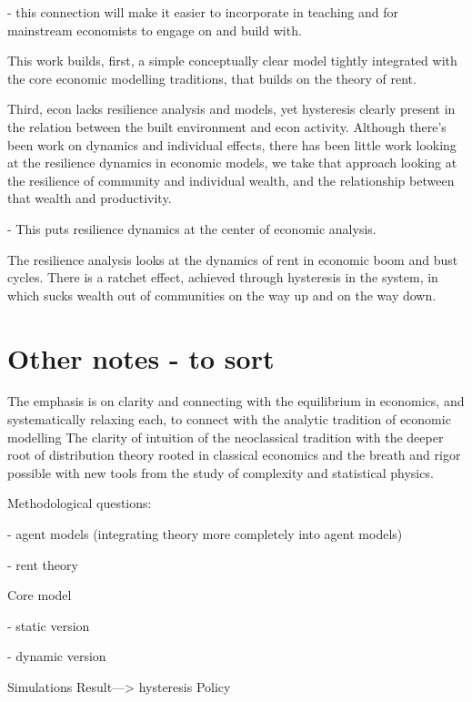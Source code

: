 - this connection will make it easier to incorporate in teaching and for mainstream economists to engage on and build with.


This work builds, first, a simple conceptually clear model tightly integrated with the core economic modelling traditions, that builds on the theory of rent.


Third, econ lacks resilience analysis and models, yet hysteresis clearly present in the relation between the built environment and econ activity. Although there's been work on dynamics and individual effects, there has been little work looking at the resilience dynamics in economic models, we take that approach looking at the resilience of community and individual wealth, and the relationship between that wealth and productivity. 

- This puts resilience dynamics at the center of economic analysis.

The resilience analysis looks at the dynamics of rent in economic boom and bust cycles.
There is a ratchet effect, achieved through hysteresis in the system, in which sucks wealth out of communities on the way up and on the way down. %


\section{Other notes - to sort}


The emphasis is on clarity and connecting with the equilibrium in economics, and systematically relaxing each, to connect with the analytic tradition of economic modelling
The clarity of intuition of the neoclassical tradition with the deeper root of distribution theory rooted in classical economics and the breath and rigor possible with new tools from the study of complexity and statistical physics.

Methodological questions: 

    - agent models (integrating theory more completely into agent models)
    
    - rent theory

Core model

    - static version
    
    - dynamic version

Simulations
Result---> hysteresis
Policy